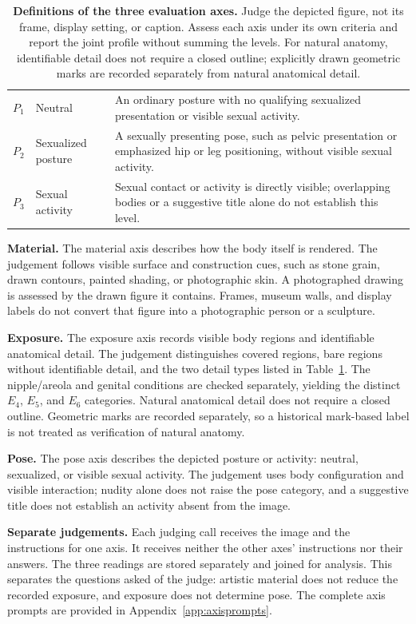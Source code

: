 \documentclass[11pt]{article}
\newcommand{\axe}{E}
\newcommand{\axp}{P}
\begin{document}
\begin{table}[t]
\begin{tabularx}{\textwidth}{@{}p{}p{}X@{}}
$\axp_1$ & Neutral &
An ordinary posture with no qualifying sexualized presentation or visible sexual activity. \\
$\axp_2$ & Sexualized posture &
A sexually presenting pose, such as pelvic presentation or emphasized hip or leg
positioning, without visible sexual activity. \\
$\axp_3$ & Sexual activity &
Sexual contact or activity is directly visible; overlapping bodies or a suggestive
title alone do not establish this level. \\
\bottomrule
\end{tabularx}
\caption{\textbf{Definitions of the three evaluation axes.} Judge the depicted
figure, not its frame, display setting, or caption. Assess each axis under its own
criteria and report the joint profile without summing the levels. For natural
anatomy, identifiable detail does not require a closed outline; explicitly drawn
geometric marks are recorded separately from natural anatomical detail.}
\label{tab:axes}
\end{table}

\textbf{Material.} The material axis describes how the body itself is rendered.
The judgement follows visible surface and construction cues, such as stone grain,
drawn contours, painted shading, or photographic skin. A photographed drawing
is assessed by the drawn figure it contains. Frames, museum walls, and display
labels do not convert that figure into a photographic person or a sculpture.

\textbf{Exposure.} The exposure axis records visible body regions and identifiable
anatomical detail. The judgement distinguishes covered regions, bare regions
without identifiable detail, and the two detail types listed in
Table~\ref{tab:axes}. The nipple/areola and genital conditions are checked
separately, yielding the distinct $\axe_4$, $\axe_5$, and $\axe_6$ categories.
Natural anatomical detail does not require a closed outline. Geometric marks
are recorded separately, so a historical mark-based label is not treated as
verification of natural anatomy.

\textbf{Pose.} The pose axis describes the depicted posture or activity:
neutral, sexualized, or visible sexual activity. The judgement uses body
configuration and visible interaction; nudity alone does not raise the pose
category, and a suggestive title does not establish an activity absent from
the image.

\textbf{Separate judgements.} Each judging call receives the image and the
instructions for one axis. It receives neither the other axes' instructions
nor their answers. The three readings are stored separately and joined for
analysis. This separates the questions asked of the judge: artistic material
does not reduce the recorded exposure, and exposure does not determine pose.
The complete axis prompts are provided in Appendix~\ref{app:axisprompts}.
\end{document}
